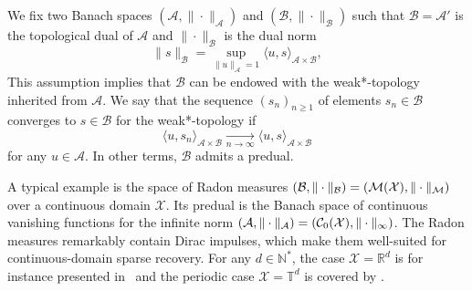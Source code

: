 \documentclass[12pt]{article}
\begin{document}
    We fix two Banach spaces $( \mathcal{A}, \| \cdot \|_{\mathcal{A}})$ and $( \mathcal{B}, \| \cdot \|_{\mathcal{B}})$ such that $\mathcal{B} = \mathcal{A}'$ is the topological dual of $\mathcal{A}$ and $\| \cdot \|_{\mathcal{B}}$ is the dual norm 
    \begin{equation*}
        \| s \|_{\mathcal{B}} = \sup_{\|u \|_{\mathcal{A}}=1} \langle u, s \rangle_{\mathcal{A}\times\mathcal{B}}, 
    \end{equation*}
    This assumption implies that $\mathcal{B}$ can be endowed with the weak*-topology inherited from $\mathcal{A}$. We say that the sequence $(s_n)_{n\geq 1}$ of elements $s_n \in \mathcal{B}$ converges to $s \in \mathcal{B}$ for the weak*-topology if 
    \begin{equation*}
        \langle u , s_n \rangle_{\mathcal{A}\times\mathcal{B}} \underset{n\rightarrow \infty}{\longrightarrow} \langle u, s \rangle_{\mathcal{A}\times\mathcal{B}} 
    \end{equation*}
    for any $u \in \mathcal{A}$.
    In other terms, $\mathcal{B}$ admits a predual\footnotemark.

    A typical example is the space of Radon measures $(\mathcal{B}, \|\cdot \|_{\mathcal{B}}) = ({\mathcal{M}}({\mathcal{X}}), \|\cdot \|_{\mathcal{M}})$ over a continuous domain $\mathcal{X}$. Its predual is the Banach space of continuous vanishing functions for the infinite norm $(\mathcal{A}, \|\cdot \|_{\mathcal{A}}) =({\mathcal{C}}_0({\mathcal{X}}), \| \cdot \|_{\infty})$. The Radon measures remarkably contain Dirac impulses, which make them well-suited for continuous-domain sparse recovery. For any $d\in\mathbb{N}^*$, the case $\mathcal{X}=\mathbb{R}^d$ is for instance presented in~\cite{unser2017splines,Unser2020} and the periodic case $\mathcal{X}=\mathbb{T}^d$ is covered by \cite{fageot2020tv}.
\end{document}
